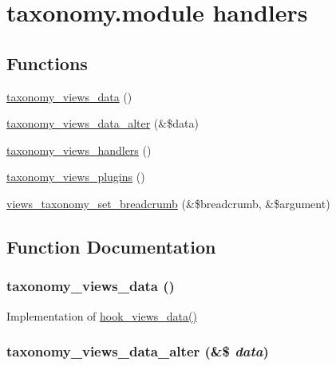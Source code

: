 \hypertarget{group__views__taxonomy__module}{
\section{taxonomy.module handlers}
\label{group__views__taxonomy__module}
}
\subsection*{Functions}
\begin{CompactItemize}
\item 
\hyperlink{group__views__taxonomy__module_g7d924f539ca1e7da381929bec742e8fd}{taxonomy\_\-views\_\-data} ()
\item 
\hyperlink{group__views__taxonomy__module_ga6aab8471715a703a640f25f9cfe8efb}{taxonomy\_\-views\_\-data\_\-alter} (\&\$data)
\item 
\hyperlink{group__views__taxonomy__module_gacf596f7b32d4d15da0cbb2e26e44b7b}{taxonomy\_\-views\_\-handlers} ()
\item 
\hyperlink{group__views__taxonomy__module_gdf4c4ae0f65e3a97003ca804bfff4c9c}{taxonomy\_\-views\_\-plugins} ()
\item 
\hyperlink{group__views__taxonomy__module_ge3ea861745bda984b3d544ac856012e0}{views\_\-taxonomy\_\-set\_\-breadcrumb} (\&\$breadcrumb, \&\$argument)
\end{CompactItemize}


\subsection{Function Documentation}
\hypertarget{group__views__taxonomy__module_g7d924f539ca1e7da381929bec742e8fd}{
\subsubsection[{taxonomy\_\-views\_\-data}]{\setlength{\rightskip}{0pt plus 5cm}taxonomy\_\-views\_\-data ()}}
\label{group__views__taxonomy__module_g7d924f539ca1e7da381929bec742e8fd}


Implementation of \hyperlink{group__views__hooks_g227057901681e4a33e33c199c7a8c989}{hook\_\-views\_\-data()} \hypertarget{group__views__taxonomy__module_ga6aab8471715a703a640f25f9cfe8efb}{
\subsubsection[{taxonomy\_\-views\_\-data\_\-alter}]{\setlength{\rightskip}{0pt plus 5cm}taxonomy\_\-views\_\-data\_\-alter (\&\$ {\em data})}}
\label{group__views__taxonomy__module_ga6aab8471715a703a640f25f9cfe8efb}


